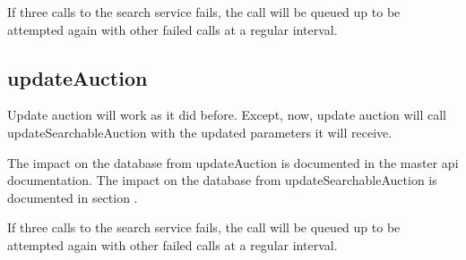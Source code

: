 \documentclass[12pt,a4paper]{article}
\begin{document}
If three calls to the search service fails, the call will be queued up to be
attempted again with other failed calls at a regular interval.


\subsection{updateAuction}

Update auction will work as it did before. Except, now, update auction will
call updateSearchableAuction with the updated parameters it will receive.

The impact on the database from updateAuction is documented in the master api
documentation. The impact on the database from updateSearchableAuction is
documented in section .

If three calls to the search service fails, the call will be queued up to be
attempted again with other failed calls at a regular interval.
\end{document}
